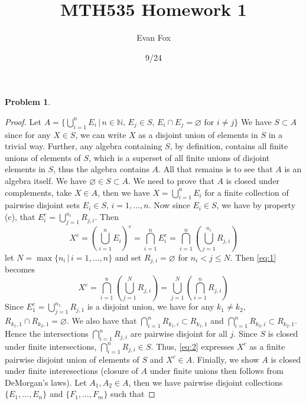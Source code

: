 \documentclass{article}
\title{MTH535 Homework 1}
\author{Evan Fox}
\date{9/24}
\newtheorem{prb}{Problem}
\begin{document}
\maketitle
	    \begin{prb}  \end{prb} 
	    \begin{proof} 
	Let $A = \{ \bigcup_{i = 1}^n E_i	\, | \, n \in \mathbb{N}, \, E_j \in S, \,  E_i \cap E_j = \varnothing \text{ for } i \neq j \} $
	    We have $S \subset A$ since for any $X \in S$, we can write $X$ as a disjoint union of elements in $S$ 
	    in a trivial way. Further, any algebra containing $S$, by definition, contains all finite unions
	    of elements of $S$, which is a superset of all finite unions of disjoint elements in $S$, thus the algebra 
	    contains $A$. All that remains is to see that $A$ is an algebra itself. We have $\varnothing \in S \subset A$. 
	 We need to prove that $A$ is closed under complements, take $X \in A$, then we have $X = \bigcup_{i = 1}^n E_i$
	 for a finite collection of pairwise disjoint sets $E_i \in S$, $i = 1, \dots, n$. Now since $E_i \in S$, 
	 we have by property (c), that $E_i^c = \bigcup_{j =1}^{n_i} R_{j, i}$. Then 
	 \begin{equation}
		 \label{eq:1}
		 X^c = \left(\bigcup_{i = 1}^n E_i \right)^c = \bigcap_{i =1 }^n E_i^c = \bigcap_{i = 1}^n \left( \bigcup_{j=1}^{n_i} R_{j, i}\right)
	 \end{equation}
	 let $N = \max\{ n_i \, |\, i = 1, \dots, n\} $ and set $R_{j, i} = \varnothing$ for $ n_i < j \leq N$. Then \ref{eq:1} becomes 
	 \begin{equation}
		 \label{eq:2}
		 X^c =  \bigcap_{i = 1}^n \left( \bigcup_{j=1}^{N} R_{j, i}\right) = \bigcup_{j = 1}^N \left( \bigcap_{i = 1}^n R_{j, i} \right)
	 \end{equation}
	 Since $E_1^c = \bigcup_{j = 1}^{n_1} R_{j, 1}$ is a disjoint union, we have for any $k_1 \neq k_2$, $R_{k_1, 1} \cap R_{k_2, 1} = \varnothing$. 
	 We also have that $\bigcap_{i =1}^n R_{k_1, i} \subset R_{k_1, 1}$ and $\bigcap_{i =1}^n R_{k_2, i} \subset R_{k_2, 1}$. Hence the intersections 
	 $\bigcap_{i =1}^n R_{j, i}$ are pairwise disjoint for all $j$. Since $S$ is closed under finite intersections, $\bigcap_{i =1}^n R_{j, i} \in S$. 
	 Thus, \ref{eq:2} expresses $X^c$ as a finite pairwise disjoint union of elements of $S$ and $X^c \in A$.  
	 Finially, we show $A$ is closed under finite interesections (closure of $A$ under finite unions then follows from DeMorgan's laws).  
	 Let $A_1, A_2 \in A$, then we have pairwise disjoint collections $\{E_1, \dots, E_n\}$ and $\{F_1, \dots, F_m\}$ such that 

\end{proof}
\end{document}
